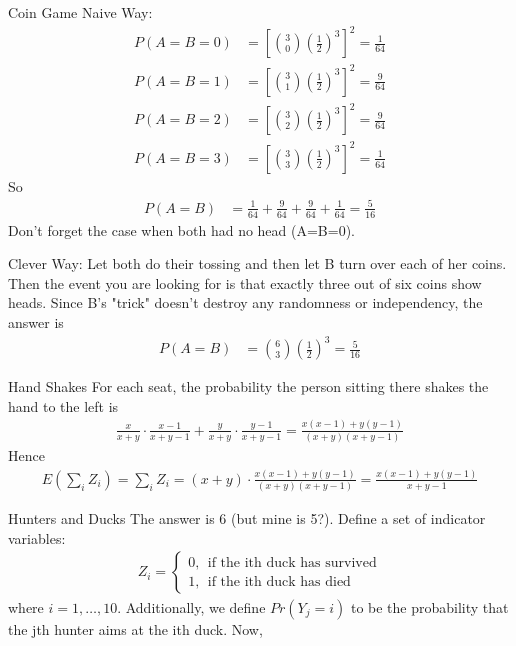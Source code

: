 \documentclass[oldfontcommands]{memoir}
\begin{document}
{\begin{answer}{Coin Game}
Naive Way:
\begin{align}
	P(A=B=0) &= \left[\binom{3}{0} \left(\frac{1}{2}\right)^3\right]^2 = \frac{1}{64}\\
	P(A=B=1) &= \left[\binom{3}{1} \left(\frac{1}{2}\right)^3\right]^2 = \frac{9}{64}\\
	P(A=B=2) &= \left[\binom{3}{2} \left(\frac{1}{2}\right)^3\right]^2 = \frac{9}{64}\\
	P(A=B=3) &= \left[\binom{3}{3} \left(\frac{1}{2}\right)^3\right]^2 = \frac{1}{64}	
\end{align}
So
\begin{align}
	P(A=B) &= \frac{1}{64} + \frac{9}{64} + \frac{9}{64} + \frac{1}{64} = \frac{5}{16}
\end{align}
Don't forget the case when both had no head (A=B=0).

Clever Way: Let both do their tossing and then let B turn over each of her coins. Then the event you are looking for is that exactly three out of six coins show heads. Since B's "trick" doesn't destroy any randomness or independency, the answer is
\begin{align}
	P(A=B) &= \binom{6}{3} \left(\frac{1}{2}\right)^3 = \frac{5}{16}
\end{align}
\end{answer}
\begin{answer}{Hand Shakes}
For each seat, the probability the person sitting there shakes the hand to the left is
\begin{align}
	\frac{x}{x+y} \cdot \frac{x-1}{x+y-1} + \frac{y}{x+y} \cdot \frac{y-1}{x+y-1} = \frac{x(x-1) + y(y-1)}{(x+y)(x+y-1)}
\end{align}
Hence
\begin{align}
	E\left(\sum_i Z_i\right) = \sum_i Z_i = (x+y) \cdot \frac{x(x-1) + y(y-1)}{(x+y)(x+y-1)} = \frac{x(x-1) + y(y-1)}{x+y-1}
\end{align}\end{answer}
\begin{answer}{Hunters and Ducks}
The answer is 6 (but mine is 5?). Define a set of indicator variables:
\begin{align*}
    Z_i = \begin{cases} 
    0, ~~ \mbox{if the ith duck has survived}\\
    1, ~~ \mbox{if the ith duck has died}		
    \end{cases}
\end{align*}
where $i = 1, \dots, 10$. Additionally, we define $Pr(Y_j = i)$ to be the probability that the jth hunter aims at the ith duck. Now,

\end{answer}}
\end{document}
